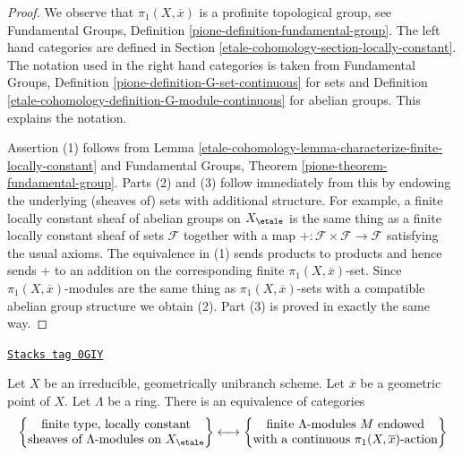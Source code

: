 \begin{proof}
We observe that $\pi_1(X, \overline{x})$ is a profinite
topological group, see Fundamental Groups, Definition
\ref{pione-definition-fundamental-group}.
The left hand categories are defined in
Section \ref{etale-cohomology-section-locally-constant}.
The notation used in the right hand categories is taken from
Fundamental Groups, Definition \ref{pione-definition-G-set-continuous}
for sets and
Definition \ref{etale-cohomology-definition-G-module-continuous} for abelian groups.
This explains the notation.

\medskip\noindent
Assertion (1) follows from
Lemma \ref{etale-cohomology-lemma-characterize-finite-locally-constant}
and Fundamental Groups, Theorem \ref{pione-theorem-fundamental-group}.
Parts (2) and (3) follow immediately from this by endowing the underlying
(sheaves of) sets with additional structure. For example, a finite
locally constant sheaf of abelian groups on $X_\etale$ is the same thing
as a finite locally constant sheaf of sets $\mathcal{F}$
together with a map $+ : \mathcal{F} \times \mathcal{F} \to \mathcal{F}$
satisfying the usual axioms. The equivalence in (1) sends products
to products and hence sends $+$ to an addition on the corresponding
finite $\pi_1(X, \overline{x})$-set. Since $\pi_1(X, \overline{x})$-modules
are the same thing as $\pi_1(X, \overline{x})$-sets with a compatible
abelian group structure we obtain (2). Part (3) is proved in
exactly the same way.
\end{proof}

\begin{lemma}
\label{etale-cohomology-lemma-locally-constant-on-connected-geom-unibranch}
\href{https://stacks.math.columbia.edu/tag/0GIY}{\texttt{Stacks tag 0GIY}}

Let $X$ be an irreducible, geometrically unibranch scheme.
Let $\overline{x}$ be a geometric point of $X$.
Let $\Lambda$ be a ring. There is an equivalence of categories
$$
\left\{
\begin{matrix}
\text{finite type, locally constant}\\
\text{sheaves of }\Lambda\text{-modules on }X_\etale
\end{matrix}
\right\}
\longleftrightarrow
\left\{
\begin{matrix}
\text{finite }\Lambda\text{-modules }M\text{ endowed}\\
\text{with a continuous }\pi_1(X, \overline{x})\text{-action}
\end{matrix}
\right\}
$$
\end{lemma}

